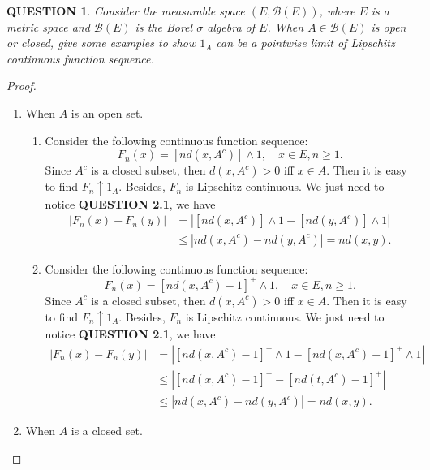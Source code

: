\documentclass[12pt]{article}
\renewcommand{\b}{\mathscr{B}}
\renewcommand{\(}{\left(}%
\renewcommand{\)}{\right)}%
\renewcommand{\[}{\left[}%
\renewcommand{\]}{\right]}%
\newtheorem{question}{QUESTION}[section]}
\newtheorem{proof}{Proof.}}
\begin{document}
  \begin{question}
   Consider the measurable space $(E,\b(E) )$, where $E$ is a metric space and $\b(E)$ is the Borel $\sigma$ algebra of $E$. When $A\in\b(E)$ is open or closed, give some examples to show $1_A$ can be a pointwise limit of Lipschitz continuous function sequence.
  \end{question}
  \begin{proof}
   \begin{enumerate}
    \item When $A$ is an open set.
    \begin{enumerate}
     \item Consider the following continuous function sequence:
    \begin{equation*}
     F_n(x)=[nd(x,A^c)]\wedge 1,\quad x\in E,n\geq 1.
    \end{equation*}
    Since $A^c$ is a closed subset, then $d(x,A^c)>0$ iff $x\in A$. Then it is easy to find $F_n\uparrow 1_A$. Besides, $F_n$ is Lipschitz continuous. We just need to notice {\bfseries QUESTION 2.1}, we have
    \begin{equation*}
     \begin{split}
      |F_n(x)-F_n(y)|&=|[nd(x,A^c)]\wedge 1-[nd(y,A^c)]\wedge 1|\\
      &\leq |nd(x,A^c)-nd(y,A^c) |=nd(x,y).
     \end{split}
    \end{equation*}
     \item Consider the following continuous function sequence:
     \begin{equation*}
      F_n(x)=[nd(x,A^c)-1]^+\wedge 1,\quad x\in E,n\geq 1.
     \end{equation*}
     Since $A^c$ is a closed subset, then $d(x,A^c)>0$ iff $x\in A$. Then it is easy to find $F_n\uparrow 1_A$. Besides, $F_n$ is Lipschitz continuous. We just need to notice {\bfseries QUESTION 2.1}, we have
    \begin{equation*}
     \begin{split}
      |F_n(x)-F_n(y)|&=|[nd(x,A^c)-1]^+\wedge 1-[nd(x,A^c)-1]^+\wedge 1|\\
      &\leq |[nd(x,A^c)-1]^+-[nd(t,A^c)-1]^+ |\\
      &\leq |nd(x,A^c)-nd(y,A^c)| =nd(x,y).
     \end{split}
    \end{equation*}
    \end{enumerate}
    \item When $A$ is a closed set.

\end{enumerate}
\end{proof}
\end{document}
